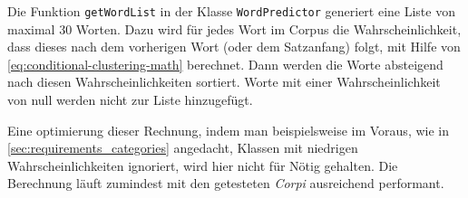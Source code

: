     Die Funktion \texttt{getWordList} in der Klasse \texttt{WordPredictor} generiert eine Liste von maximal 30 Worten. Dazu wird für jedes Wort im Corpus die Wahrscheinlichkeit, dass dieses nach dem vorherigen Wort (oder dem Satzanfang) folgt, mit Hilfe von \autoref{eq:conditional-clustering-math} berechnet. Dann werden die Worte absteigend nach diesen Wahrscheinlichkeiten sortiert. Worte mit einer Wahrscheinlichkeit von null werden nicht zur Liste hinzugefügt. 
    
    Eine optimierung dieser Rechnung, indem man beispielsweise im Voraus, wie in \autoref{sec:requirements_categories} angedacht, Klassen mit niedrigen Wahrscheinlichkeiten ignoriert, wird hier nicht für Nötig gehalten. Die Berechnung läuft zumindest mit den getesteten \emph{Corpi} ausreichend performant.
    
   
    
    
    
    
    
    
    
    
    
    
    
    
    
    
    
    
    
    
